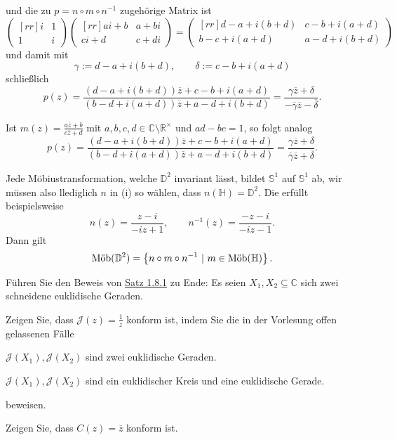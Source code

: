 \documentclass[11pt]{book}
\numberwithin{dummy}{section}
\theoremstyle{nonumberbreak}
\newenvironment{prob}[1][]{\ifthenelse{\equal{#1}{}}{\problem}{\problem[#1]}\rm}{\endproblem}
\newenvironment{sol}[1][]{\ifthenelse{\equal{#1}{}}{\solution}{\solution[#1]}\rm}{\endsolution}
\newcommand{\C}{\mathbb{C}}
\newcommand{\R}{\mathbb{R}}
\newcommand{\Sph}{\mathbb{S}}
\newcommand{\He}{\mathbb{H}}
\newcommand{\D}{\mathbb{D}}
\newcommand{\amob}{\textup{Möb}}
\newcommand{\matx}[4]{\begin{pmatrix}[rr]#1 & #2 \\[-6pt] #3 & #4 \end{pmatrix}}
\begin{document}
\begin{spacing}{1.4}
\begin{prob}
\begin{sol}
\begin{compactenum}
\begin{compactenum}
und die zu $p=n\circ m \circ n^{-1}$ zugehörige Matrix ist
$$\matx{i}{1}{1}{i} \matx{ai+b}{a+bi}{ci+d}{c+di} = \matx{d-a+i(b+d)}{c-b+i(a+d)}{b-c+i(a+d)}{a-d+i(b+d)}$$
und damit mit 
$$\gamma:= d-a + i(b+d), \qquad \delta := c-b + i (a+d)$$
schließlich 
$$p(z)=\frac{(d-a+i(b+d))\overline{z} + c-b+i(a+d)}{(b-d+i(a+d))\overline{z}+a-d+i(b+d)} = \frac{\gamma \overline{z} + \delta}{-\overline{\gamma} \overline{z} - \overline{\delta}}.$$
\item Ist $m(z)=\frac{a\overline{z}+b}{c\overline{z}+d}$ mit $a,b,c,d \in \C \setminus \R^{\times}$ und $ad-bc=1$, so folgt analog 
$$p(z)=\frac{(d-a+i(b+d))\overline{z} + c-b+i(a+d)}{(b-d+i(a+d))\overline{z}+a-d+i(b+d)} = \frac{\gamma \overline{z} + \delta}{\overline{\gamma} \overline{z} + \overline{\delta}}.$$
\end{compactenum}
\item Jede Möbiustransformation, welche $\D^2$ invariant lässt, bildet $\Sph^1$ auf $\Sph^1$ ab, wir müssen also llediglich $n$ in (i) so wählen, dass $n(\He)=\D^2$. Die erfüllt beispielsweise 
$$n(z)=\frac{z-i}{-iz+1}, \qquad n^{-1}(z)=\frac{-z-i}{-iz-1}.$$
Dann gilt 
$$\amob(\D^2)=\left\{n \circ m \circ n^{-1} \ \vert \ m \in \amob(\He)\right\}.$$
\end{compactenum}

\end{sol}


\end{prob}



\hypertarget{Avierdrei}{}
\begin{prob}    %
Führen Sie den Beweis von \hyperlink{satzeinsachteins}{Satz 1.8.1} zu Ende: Es seien $X_1,X_2 \subseteq \C$ sich zwei schneidene euklidische Geraden.
\begin{compactenum}
\item Zeigen Sie, dass $\mathcal{J}(z)=\frac{1}{z}$ konform ist, indem Sie die in der Vorlesung offen gelassenen Fälle
\begin{compactenum}
\item $\mathcal{J}(X_1), \mathcal{J}(X_2)$ sind zwei euklidische Geraden.
\item $\mathcal{J}(X_1), \mathcal{J}(X_2)$ sind ein euklidischer Kreis und eine euklidische Gerade.
\end{compactenum}
beweisen.
\item Zeigen Sie, dass $C(z)=\overline{z}$ konform ist.
\end{compactenum}



\end{prob}
\end{spacing}
\end{document}
